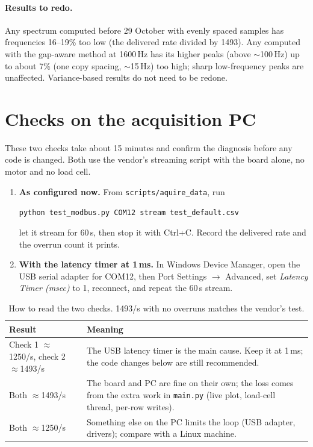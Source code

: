 \documentclass[11pt]{article}
\newcommand{\code}[1]{\texttt{#1}}
\begin{document}
\paragraph{Results to redo.} Any spectrum computed before 29 October with
evenly spaced samples has frequencies 16--19\% too low (the delivered rate
divided by 1493). Any computed with the gap-aware method at 1600\,Hz has
its higher peaks (above $\sim$100\,Hz) up to about 7\% (one copy spacing,
$\sim$15\,Hz) too high; sharp low-frequency peaks are unaffected. Variance-based results do
not need to be redone.

\section{Checks on the acquisition PC}
\label{sec:verify}

These two checks take about 15 minutes and confirm the diagnosis before any
code is changed. Both use the vendor's streaming script with the board alone,
no motor and no load cell.

\begin{enumerate}
  \item \textbf{As configured now.} From \code{scripts/aquire\_data}, run
        \begin{center}\small\code{python test\_modbus.py COM12 stream test\_default.csv}\end{center}
        let it stream for 60\,s, then stop it with Ctrl+C. Record the
        delivered rate and the overrun count it prints.
  \item \textbf{With the latency timer at 1\,ms.} In Windows Device Manager,
        open the USB serial adapter for COM12, then Port Settings $\to$
        Advanced, set \emph{Latency Timer (msec)} to 1, reconnect, and repeat
        the 60\,s stream.
\end{enumerate}

\begin{table}[H]
  \centering
  \begin{tabular}{p{5.5cm}p{9cm}}
    \toprule
    Result & Meaning \\
    \midrule
    Check 1 $\approx$1250/s, check 2 $\approx$1493/s & The USB latency
    timer is the main cause. Keep it at 1\,ms; the code changes below are
    still recommended. \\
    \addlinespace
    Both $\approx$1493/s & The board and PC are fine on their own; the
    loss comes from the extra work in \code{main.py} (live plot, load-cell
    thread, per-row writes). \\
    \addlinespace
    Both $\approx$1250/s & Something else on the PC limits the loop (USB
    adapter, drivers); compare with a Linux machine. \\
    \bottomrule
  \end{tabular}
  \caption{How to read the two checks. 1493/s with no overruns matches the
  vendor's test.}
\end{table}
\end{document}

